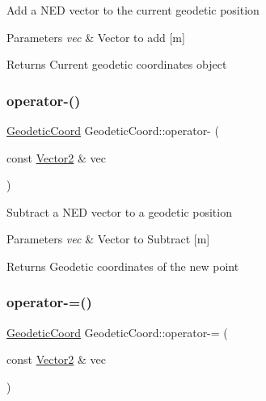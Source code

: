 Add a N\+ED vector to the current geodetic position 
\begin{DoxyParams}{Parameters}
{\em vec} & Vector to add \mbox{[}m\mbox{]} \\
\hline
\end{DoxyParams}
\begin{DoxyReturn}{Returns}
Current geodetic coordinates object 
\end{DoxyReturn}
\mbox{\label{class_m210_1_1_geodetic_coord_ab3e11a59306f739faedd8be52472d2c4}} 
\subsubsection{\texorpdfstring{operator-\/()}{operator-()}}
{\footnotesize\ttfamily \mbox{\hyperlink{class_m210_1_1_geodetic_coord}{Geodetic\+Coord}} Geodetic\+Coord\+::operator-\/ (\begin{DoxyParamCaption}\item[{const \mbox{\hyperlink{struct_vector2}{Vector2}} \&}]{vec }\end{DoxyParamCaption})}

Subtract a N\+ED vector to a geodetic position 
\begin{DoxyParams}{Parameters}
{\em vec} & Vector to Subtract \mbox{[}m\mbox{]} \\
\hline
\end{DoxyParams}
\begin{DoxyReturn}{Returns}
Geodetic coordinates of the new point 
\end{DoxyReturn}
\mbox{\label{class_m210_1_1_geodetic_coord_ab73b337cbae14719e288ad88dcfdefd4}} 
\subsubsection{\texorpdfstring{operator-\/=()}{operator-=()}}
{\footnotesize\ttfamily \mbox{\hyperlink{class_m210_1_1_geodetic_coord}{Geodetic\+Coord}} Geodetic\+Coord\+::operator-\/= (\begin{DoxyParamCaption}\item[{const \mbox{\hyperlink{struct_vector2}{Vector2}} \&}]{vec }\end{DoxyParamCaption})}

